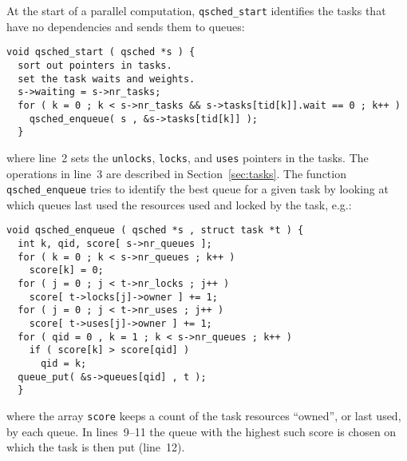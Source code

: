 \documentclass[preprint]{elsarticle}
\newcommand{\sect}[1]
    {Section~\ref{sec:#1}}
\begin{document}
At the start of a parallel computation, {\tt qsched\_start}
identifies the tasks that have no dependencies and sends them
to queues:
\begin{center}\begin{minipage}{0.9\textwidth}
    \begin{lstlisting}
void qsched_start ( qsched *s ) {
  sort out pointers in tasks.
  set the task waits and weights.
  s->waiting = s->nr_tasks;
  for ( k = 0 ; k < s->nr_tasks && s->tasks[tid[k]].wait == 0 ; k++ )
    qsched_enqueue( s , &s->tasks[tid[k]] );
  }
    \end{lstlisting}
\end{minipage}\end{center}
\noindent where line~2 sets the {\tt unlocks}, {\tt locks},
and {\tt uses} pointers in the tasks.
The operations in line~3 are described in \sect{tasks}.
The function {\tt qsched\_enqueue} tries to identify the best
queue for a given task by looking at which queues last used
the resources used and locked by the task, e.g.:
\begin{center}\begin{minipage}{0.9\textwidth}
    \begin{lstlisting}
void qsched_enqueue ( qsched *s , struct task *t ) {
  int k, qid, score[ s->nr_queues ];
  for ( k = 0 ; k < s->nr_queues ; k++ )
    score[k] = 0;
  for ( j = 0 ; j < t->nr_locks ; j++ )
    score[ t->locks[j]->owner ] += 1;
  for ( j = 0 ; j < t->nr_uses ; j++ )
    score[ t->uses[j]->owner ] += 1;
  for ( qid = 0 , k = 1 ; k < s->nr_queues ; k++ )
    if ( score[k] > score[qid] )
      qid = k;
  queue_put( &s->queues[qid] , t );
  }
    \end{lstlisting}
\end{minipage}\end{center}
\noindent where the array {\tt score} keeps a count of the
task resources ``owned'', or last used, by each queue.
In lines~9--11 the queue with the highest such score is 
chosen on which the task is then put (line~12).
\end{document}
